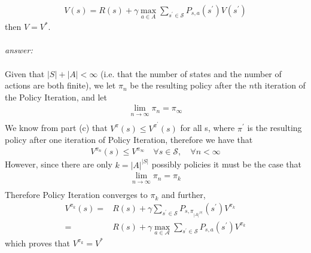 \documentclass{article}
\begin{document}
\begin{enumerate}[label=(\alph*)]
\begin{align*}
    V(s) = R(s) + \gamma\max_{a\in A}\sum_{s^\prime \in \mathcal{S}}P_{s,a}(s^\prime)V(s^\prime)
\end{align*}
then $V = V^*$.\\\\
\textit{answer:}\\\\
Given that $|S|+|A| < \infty$ (i.e. that the number of states and the number of \\\m actions are both finite), we let $\pi_n$ be the resulting policy after the $n$th iteration of the Policy Iteration, and let
\begin{align*}
    \lim_{n\xrightarrow[]{}\infty}\pi_n = \pi_{\infty}
\end{align*}
We know from part (c) that $V^\pi(s) \leq V^{\pi^\prime}(s)$ for all s, where $\pi^\prime$ is the resulting policy after one iteration of Policy Iteration, therefore we have that
\begin{align*}
    V^{\pi_n}(s) \leq V^{\pi_\infty} \quad\forall s \in \mathcal{S},  \quad \forall n < \infty
\end{align*}
However, since there are only $k = |A|^{|S|}$ possibly policies it must be the case that
\begin{align*}
    \lim_{n\xrightarrow[]{}\infty}\pi_n = \pi_{k}
\end{align*}
Therefore Policy Iteration converges to $\pi_{k}$ and further,
\begin{align*}
    V^{\pi_{k}}(s) =&{} R(s) + \gamma\sum_{s^\prime \in \mathcal{S}}P_{s,\pi_{|A|^|S|}}(s^\prime)V^{\pi_{k}}\\
    =&{} R(s) + \gamma\max_{a\in \mathcal{A}}\sum_{s^\prime \in \mathcal{S}}P_{s,a}(s^\prime)V^{\pi_{k}}
\end{align*}
which proves that $V^{\pi_{k}} = V^*$
\end{enumerate}
\end{document}
